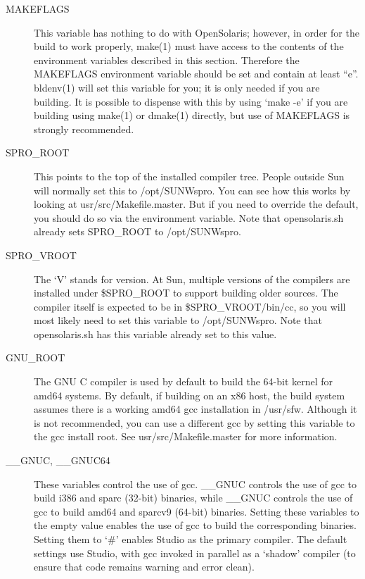 \documentclass{article}
\begin{document}
\begin{description}
\item[MAKEFLAGS]

  This variable has nothing to do with OpenSolaris; however, in order for the
  build to work properly, make(1) must have access to the contents of the
  environment variables described in this section. Therefore the MAKEFLAGS
  environment variable should be set and contain at least ``e''. bldenv(1) will
  set this variable for you; it is only needed if you are building. It is possible
  to dispense with this by using `make -e' if you are building using make(1) or
  dmake(1) directly, but use of MAKEFLAGS is strongly recommended.

\item[SPRO\_ROOT]

  This points to the top of the installed compiler tree.  People outside Sun will
  normally set this to /opt/SUNWspro.  You can see how this works by looking at
  usr/src/Makefile.master.  But if you need to override the default, you should do
  so via the environment variable.  Note that opensolaris.sh already sets
  SPRO\_ROOT to /opt/SUNWspro.

\item[SPRO\_VROOT]

  The `V' stands for version. At Sun, multiple versions of the compilers are
  installed under \${SPRO\_ROOT} to support building older sources. The compiler
  itself is expected to be in \${SPRO\_VROOT}/bin/cc, so you will most likely need
  to set this variable to /opt/SUNWspro. Note that opensolaris.sh has this
  variable already set to this value.

\item[GNU\_ROOT]

  The GNU C compiler is used by default to build the 64-bit kernel for amd64
  systems. By default, if building on an x86 host, the build system assumes there
  is a working amd64 gcc installation in /usr/sfw. Although it is not recommended,
  you can use a different gcc by setting this variable to the gcc install
  root. See usr/src/Makefile.master for more information.

\item[\_\_GNUC, \_\_GNUC64]

  These variables control the use of gcc. \_\_GNUC controls the use of gcc to build
  i386 and sparc (32-bit) binaries, while \_\_GNUC controls the use of gcc to
  build amd64 and sparcv9 (64-bit) binaries. Setting these variables to the empty
  value enables the use of gcc to build the corresponding binaries. Setting them
  to `\#' enables Studio as the primary compiler. The default settings use Studio,
  with gcc invoked in parallel as a `shadow' compiler (to ensure that code remains
  warning and error clean).


\end{description}
\end{document}
